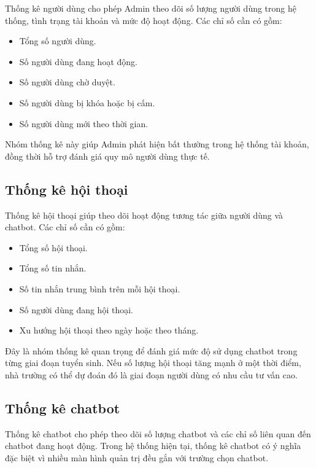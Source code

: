 \documentclass[12pt,a4paper]{report}
\begin{document}
Thống kê người dùng cho phép Admin theo dõi số lượng người dùng trong hệ thống, tình trạng tài khoản và mức độ hoạt động. Các chỉ số cần có gồm:

\begin{itemize}
    \item Tổng số người dùng.
    \item Số người dùng đang hoạt động.
    \item Số người dùng chờ duyệt.
    \item Số người dùng bị khóa hoặc bị cấm.
    \item Số người dùng mới theo thời gian.
\end{itemize}

Nhóm thống kê này giúp Admin phát hiện bất thường trong hệ thống tài khoản, đồng thời hỗ trợ đánh giá quy mô người dùng thực tế.

\subsection{Thống kê hội thoại}

Thống kê hội thoại giúp theo dõi hoạt động tương tác giữa người dùng và chatbot. Các chỉ số cần có gồm:

\begin{itemize}
    \item Tổng số hội thoại.
    \item Tổng số tin nhắn.
    \item Số tin nhắn trung bình trên mỗi hội thoại.
    \item Số người dùng đang hội thoại.
    \item Xu hướng hội thoại theo ngày hoặc theo tháng.
\end{itemize}

Đây là nhóm thống kê quan trọng để đánh giá mức độ sử dụng chatbot trong từng giai đoạn tuyển sinh. Nếu số lượng hội thoại tăng mạnh ở một thời điểm, nhà trường có thể dự đoán đó là giai đoạn người dùng có nhu cầu tư vấn cao.

\subsection{Thống kê chatbot}

Thống kê chatbot cho phép theo dõi số lượng chatbot và các chỉ số liên quan đến chatbot đang hoạt động. Trong hệ thống hiện tại, thống kê chatbot có ý nghĩa đặc biệt vì nhiều màn hình quản trị đều gắn với trường chọn chatbot.
\end{document}
